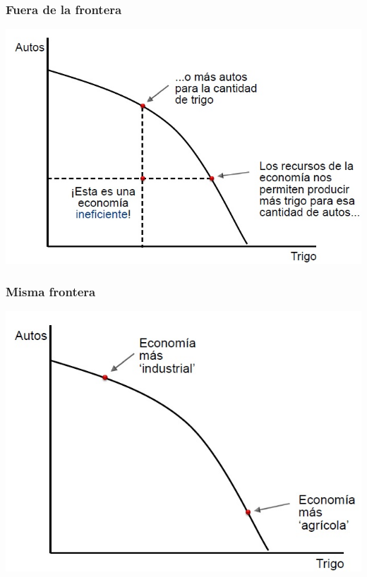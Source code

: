 \documentclass{beamer}
\begin{document}
\begin{frame}
\frametitle{Fuera de la frontera}
\begin{center}
    \includegraphics[scale=0.6]{Slides Principios de Economia/Tema_11.5_fueradelafrontera.jpg}
\end{center}
\end{frame}

\begin{frame}
\frametitle{Misma frontera}
\begin{center}
    \includegraphics[scale=0.6]{Slides Principios de Economia/Tema_11.6_lamismafrontera.jpg}
\end{center}
\end{frame}
\end{document}
